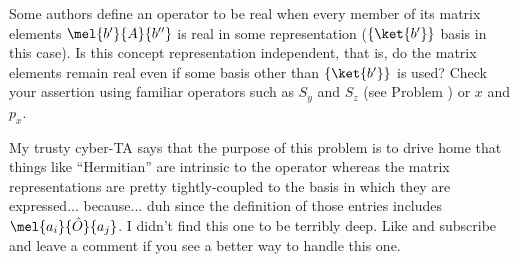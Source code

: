 \begin{question}
  Some authors define an operator to be real when every member of its
  matrix elements $\mel{b'}{A}{b''}$ is real in some representation
  ($\{\ket{b'}\}$ basis in this case).  Is this concept representation
  independent, that is, do the matrix elements remain real even if
  some basis other than $\{\ket{b'}\}$ is used? Check your assertion
  using familiar operators such as $S_y$ and $S_z$ (see Problem
  ) or $x$ and $p_x$.
\end{question}

\begin{purpose}
  My trusty cyber-TA says that the purpose of this problem is to drive
  home that things like ``Hermitian'' are intrinsic to the operator
  whereas the matrix representations are pretty tightly-coupled to the
  basis in which they are expressed... because... duh since the
  definition of those entries includes $\mel{a_i}{\hat{O}}{a_j}$.  I
  didn't find this one to be terribly deep.  Like and subscribe and
  leave a comment if you see a better way to handle this one.
\end{purpose}

